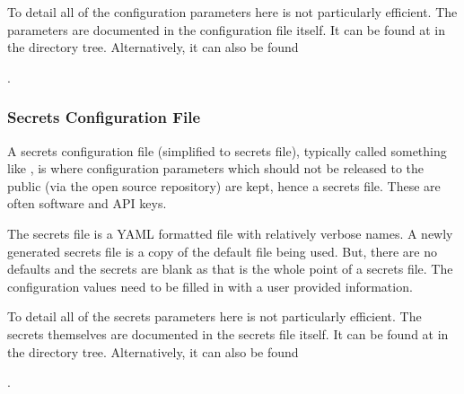 \documentclass[letterpaper,11pt,english]{sphinxmanual}
\begin{document}
\sphinxAtStartPar
To detail all of the configuration parameters here is not particularly
efficient. The parameters are documented in the configuration file itself.
It can be found at  in
the directory tree. Alternatively, it can also be found
%
\begin{footnote}[9]\sphinxAtStartFootnote
{}
%
\end{footnote}.


\subsubsection{Secrets Configuration File}
\label{\detokenize{user/configuration:secrets-configuration-file}}\label{\detokenize{user/configuration:user-configuration-secrets-configuration-file}}
\sphinxAtStartPar
A secrets configuration file (simplified to secrets file), typically
called something like , is where configuration parameters
which should not be released to the public (via the open source repository)
are kept, hence a secrets file. These are often software and API keys.

\sphinxAtStartPar
The secrets file is a YAML formatted file with relatively verbose names.
A newly generated secrets file is a copy of the default file being used. But,
there are no defaults and the secrets are blank as that is the whole point of
a secrets file. The configuration values need to be filled in with a user
provided information.

\sphinxAtStartPar
To detail all of the secrets parameters here is not particularly efficient.
The secrets themselves are documented in the secrets file itself. It can be
found at  in the directory tree.
Alternatively, it can also be found %
\begin{footnote}[10]\sphinxAtStartFootnote
{}
%
\end{footnote}.
\end{document}
